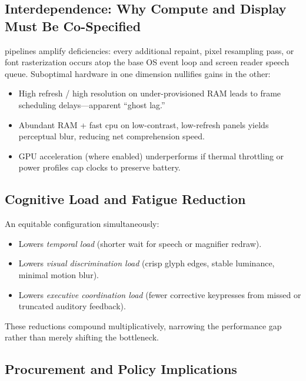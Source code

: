 \subsection*{Interdependence: Why Compute and Display Must Be Co-Specified}

 pipelines amplify deficiencies: every additional repaint, pixel resampling pass, or font rasterization occurs atop the base OS event loop and screen reader speech queue. Suboptimal hardware in one dimension nullifies gains in the other:
\begin{itemize}
	\item High refresh / high resolution on under-provisioned RAM leads to frame scheduling delays—apparent “ghost lag.”
	\item Abundant RAM + fast \gls{cpu} on low-contrast, low-refresh panels yields perceptual blur, reducing net comprehension speed.
	\item GPU acceleration (where enabled) underperforms if thermal throttling or power profiles cap clocks to preserve battery.
\end{itemize}

\subsection*{Cognitive Load and Fatigue Reduction}

An equitable configuration simultaneously:
\begin{itemize}
	\item Lowers \emph{temporal load} (shorter wait for speech or magnifier redraw).
	\item Lowers \emph{visual discrimination load} (crisp glyph edges, stable luminance, minimal motion blur).
	\item Lowers \emph{executive coordination load} (fewer corrective keypresses from missed or truncated auditory feedback).
\end{itemize}
These reductions compound multiplicatively, narrowing the performance gap rather than merely shifting the bottleneck.

\subsection*{Procurement and Policy Implications}

